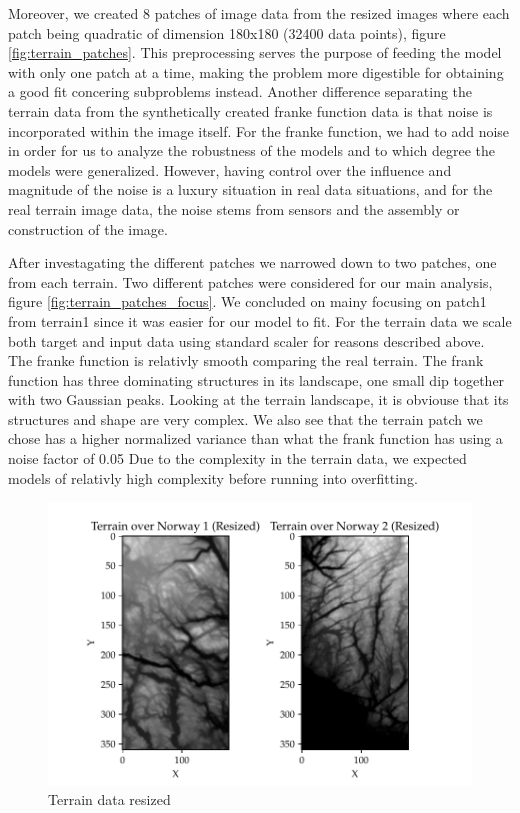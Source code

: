 \documentclass[11pt, a4paper]{article}
\begin{document}
Moreover, we created 8 patches of image data from the resized images where each patch being quadratic of dimension 180x180 (32400 data points), figure \ref{fig:terrain_patches}. This preprocessing serves the purpose of feeding the model with only one patch at a time, making the problem more digestible for obtaining a good fit concering subproblems instead. 
Another difference separating the terrain data from the synthetically created franke function data is that noise is incorporated within the image itself. For the franke function, we had to add noise in order for us to analyze the robustness of the models and to which degree the models were generalized. 
However, having control over the influence and magnitude of the noise is a luxury situation in real data situations, and for the real terrain image data, the noise stems from sensors and the assembly or construction of the image. 

After investagating the different patches we narrowed down to two patches, one from each terrain. Two different patches were considered for our main analysis, figure \ref{fig:terrain_patches_focus}.
We concluded on mainy focusing on patch1 from terrain1 since it was easier for our model to fit. For the terrain data we scale both target and input data using standard scaler for reasons described above. 
The franke function is relativly smooth comparing the real terrain. The frank function has three dominating structures in its landscape, 
one small dip together with two Gaussian peaks. Looking at the terrain landscape, it is obviouse that its structures and shape are very complex.
We also see that the terrain patch we chose has a higher normalized variance than what the frank function has using a noise factor of 0.05
Due to the complexity in the terrain data, we expected models of relativly high complexity before running into overfitting. 

\begin{figure}
  \centering
  \includegraphics[scale=0.75]{figures/EX6_terrain_data_resized.pdf}
  \caption{Terrain data resized}
  \label{fig:terrain_resized}
\end{figure}
\end{document}
